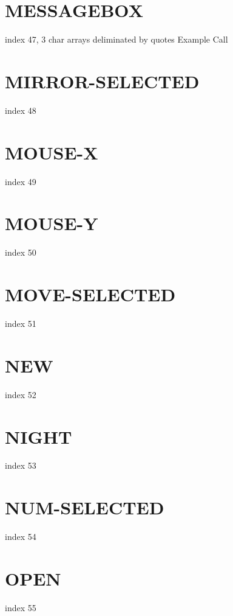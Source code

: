 \documentclass[10pt]{report}
\begin{document}
\section{MESSAGEBOX}

index 47, 3 char arrays deliminated by quotes Example Call

\section{MIRROR-SELECTED}

index 48

\section{MOUSE-X}

index 49

\section{MOUSE-Y}

index 50

\section{MOVE-SELECTED}

index 51

\section{NEW}

index 52

\section{NIGHT}

index 53

\section{NUM-SELECTED}

index 54

\section{OPEN}

index 55
\end{document}
